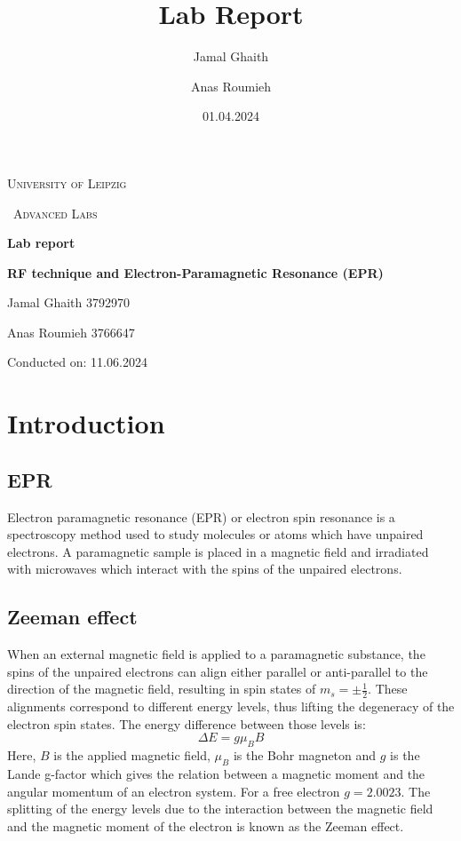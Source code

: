 \documentclass{article}
\title{Lab Report}
\author{Jamal Ghaith}
\author{Anas Roumieh}
\date{01.04.2024}
\begin{document}
\begin{titlepage}
	\centering
	{\scshape\LARGE University of Leipzig \par}
	\vspace{1cm}
	{\scshape\ Advanced Labs\par}
	\vspace{1.5cm}
	{\huge\bfseries Lab report\par}
	\vspace{2cm}
	{\huge\bfseries RF technique and Electron-Paramagnetic Resonance (EPR)\par}
	\vspace{2cm}
	{\Large Jamal Ghaith 3792970\par}
    {\Large Anas Roumieh 3766647\par}
	\vfill

    {\Large Conducted on: 11.06.2024 \par}
	\vfill
\end{titlepage}


\tableofcontents
{}
\pagebreak{}

\section{Introduction}


\subsection{EPR}
Electron paramagnetic resonance (EPR) or electron spin resonance is a spectroscopy method used to study molecules or atoms which have unpaired electrons. A paramagnetic sample is placed in a magnetic field and irradiated with microwaves which interact with the spins of the unpaired electrons. 
\subsection{Zeeman effect}
When an external magnetic field is applied to a paramagnetic substance, the spins of the unpaired electrons can align either parallel or anti-parallel to the direction of the magnetic field, resulting in spin states of $m_s = \pm \frac{1}{2}$. These alignments correspond to different energy levels, thus lifting the degeneracy of the electron spin states. The energy difference between those levels is: 
\begin{equation}
    \Delta E = g\mu_B B
\end{equation}
Here, $B$ is the applied magnetic field, $\mu_B$ is the Bohr magneton and $g$ is the Lande g-factor which gives the relation between a magnetic moment and the angular momentum of an electron system. For a free electron $g = 2.0023$. The splitting of the energy levels due to the interaction between the magnetic field and the magnetic moment of the electron is known as the Zeeman effect. 
\end{document}
